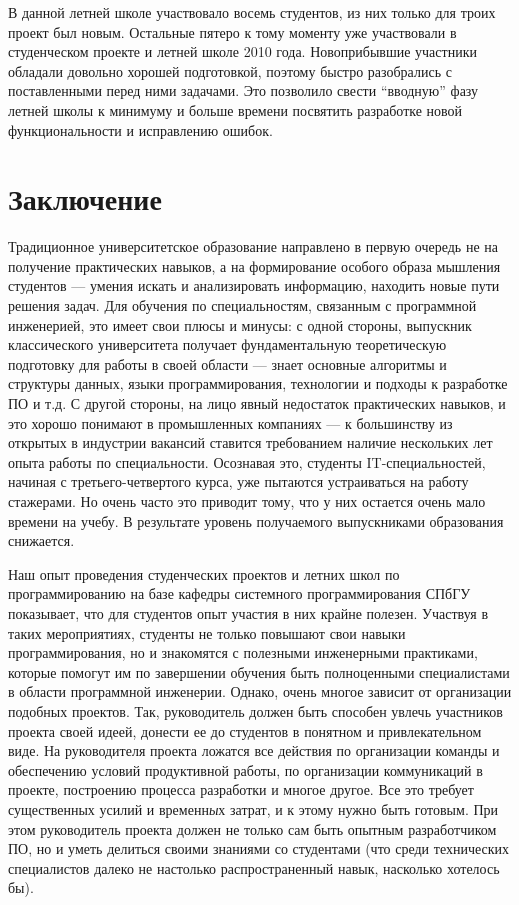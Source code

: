 \documentclass[a4paper]{article}
\begin{document}
В данной летней школе участвовало восемь студентов, из них только для троих проект был новым. Остальные пятеро к тому моменту уже участвовали в студенческом проекте и летней школе 2010 года. Новоприбывшие участники обладали довольно хорошей подготовкой, поэтому быстро  разобрались с поставленными перед ними задачами. Это позволило свести ``вводную'' фазу летней школы к минимуму и больше времени посвятить разработке новой функциональности и исправлению ошибок. 

\section{Заключение}

Традиционное университетское образование направлено в первую очередь не на получение практических навыков, а на формирование особого образа мышления студентов --- умения искать и анализировать информацию, находить новые пути решения задач. Для обучения по специальностям, связанным с программной инженерией, это имеет свои плюсы и минусы: с одной стороны, выпускник классического университета получает фундаментальную теоретическую подготовку для работы в своей области --- знает основные алгоритмы и структуры данных, языки программирования, технологии и подходы к разработке ПО и т.д. С другой стороны, на лицо явный недостаток практических навыков, и это хорошо понимают в промышленных компаниях --- к большинству из открытых в индустрии вакансий ставится требованием наличие нескольких лет опыта работы по специальности. Осознавая это, студенты IT-специальностей, начиная с третьего-четвертого курса, уже пытаются устраиваться на работу стажерами. Но очень часто это приводит тому, что у них остается очень мало времени на учебу. В результате уровень получаемого выпускниками образования снижается.

Наш опыт проведения студенческих проектов и летних школ по программированию на базе кафедры системного программирования СПбГУ показывает, что для студентов опыт участия в них крайне полезен. Участвуя в таких мероприятиях, студенты не только повышают свои навыки программирования, но и знакомятся с полезными инженерными практиками, которые помогут им по завершении обучения быть полноценными специалистами в области программной инженерии. Однако, очень многое зависит от организации подобных проектов. Так, руководитель должен быть способен увлечь участников проекта своей идеей, донести ее до студентов в понятном и привлекательном виде. На руководителя проекта ложатся все действия по организации команды и обеспечению условий продуктивной работы, по организации коммуникаций в проекте, построению процесса разработки и многое другое. Все это требует существенных усилий и временн\textit{ы}х затрат, и к этому нужно быть готовым. При этом руководитель проекта должен не только сам быть опытным разработчиком ПО, но и уметь делиться своими знаниями со студентами (что среди технических специалистов далеко не настолько распространенный навык, насколько хотелось бы). 
\end{document}
